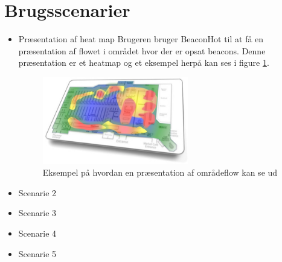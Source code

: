 \section{Brugsscenarier}
\begin{itemize}
\item Præsentation af heat map
Brugeren bruger BeaconHot til at få en præsentation af flowet i området hvor der er opsat beacons. Denne præsentation er et heatmap og et eksempel herpå kan ses i figure \ref{fig:heatmap}. 

\begin{figure}[H]
\centering
\includegraphics[width=0.6\textwidth]{billeder/heat-map}
\caption{Eksempel på hvordan en præsentation af områdeflow kan se ud}
\label{fig:heatmap}
\end{figure}

\item Scenarie 2 
\item Scenarie 3 
\item Scenarie 4 
\item Scenarie 5 
\end{itemize}